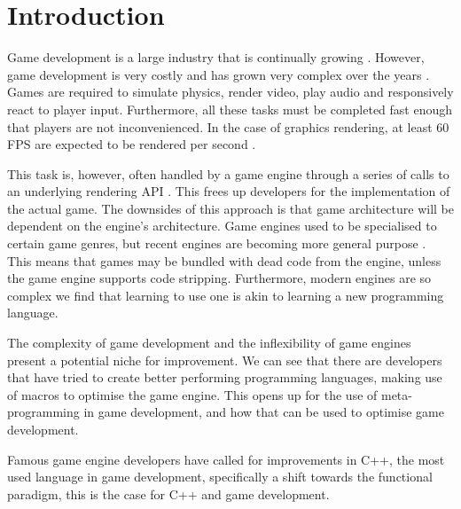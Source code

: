 \chapter{Introduction}
Game development is a large industry that is continually growing \cite{newzoo-games-market}.  However, game development is very costly and has grown very complex over the years \cite{blow2004game}. Games are required to simulate physics, render video, play audio and responsively react to player input. Furthermore, all these tasks must be completed fast enough that players are not inconvenienced. In the case of graphics rendering, at least 60 \ac{FPS} are expected to be rendered per second \cite{blow2004game}.

This task is, however, often handled by a game engine through a series of calls to an underlying rendering API \cite{ampatzoglou2007evaluation}. This frees up developers for the implementation of the actual game. The downsides of this approach is that game architecture will be dependent on the engine's architecture. Game engines used to be specialised to certain game genres, but recent engines are becoming more general purpose \cite{messaoudi2015dissecting}. This means that games may be bundled with dead code from the engine, unless the game engine supports code stripping. Furthermore, modern engines are so complex we find that learning to use one is akin to learning a new programming language.


The complexity of game development and the inflexibility of game engines present a potential niche for improvement. 
We can see that there are developers that have tried to create better performing programming languages, making use of macros to optimise the game engine\cite{blowProgrammingLanguage}. This opens up for the use of meta-programming in game development, and how that can be used to optimise game development.


Famous game engine developers have called for improvements in C++, the most used language in game development\cite{gamasutra:mostUsedProgrammingLanguage}, specifically a shift towards the functional  paradigm\cite{gamasutra:c++functional, theNextMainstreanProgrammingLanguage}, this is the case for C++ and game development.

%

